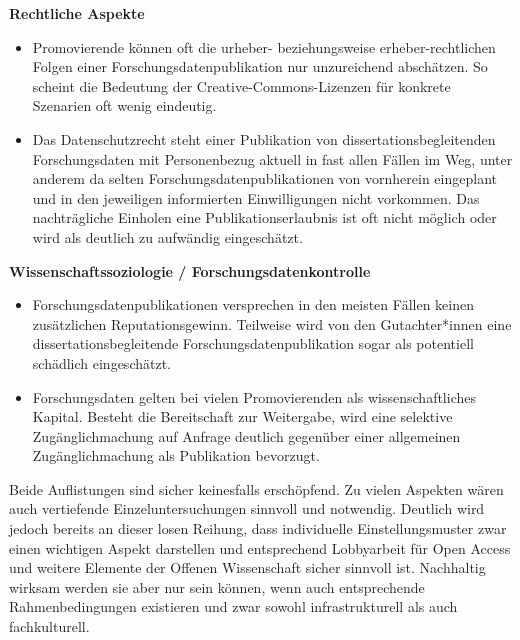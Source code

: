 \documentclass[a4paper,
fontsize=11pt,
oneside,
numbers=noperiodatend,
parskip=half-,
bibliography=totoc,
final
]{scrartcl}
\begin{document}
\textbf{Rechtliche Aspekte}

\begin{itemize}
\item
  Promovierende können oft die urheber- beziehungsweise
  erheber-rechtlichen Folgen einer Forschungsdatenpublikation nur
  unzureichend abschätzen. So scheint die Bedeutung der
  Creative-Commons-Lizenzen für konkrete Szenarien oft wenig eindeutig.
\item
  Das Datenschutzrecht steht einer Publikation von
  dissertationsbegleitenden Forschungsdaten mit Personenbezug aktuell in
  fast allen Fällen im Weg, unter anderem da selten
  Forschungsdatenpublikationen von vornherein eingeplant und in den
  jeweiligen informierten Einwilligungen nicht vorkommen. Das
  nachträgliche Einholen eine Publikationserlaubnis ist oft nicht
  möglich oder wird als deutlich zu aufwändig eingeschätzt.
\end{itemize}

\textbf{Wissenschaftssoziologie / Forschungsdatenkontrolle}

\begin{itemize}
\item
  Forschungsdatenpublikationen versprechen in den meisten Fällen keinen
  zusätzlichen Reputationsgewinn. Teilweise wird von den Gutachter*innen
  eine dissertationsbegleitende Forschungsdatenpublikation sogar als
  potentiell schädlich eingeschätzt.
\item
  Forschungsdaten gelten bei vielen Promovierenden als
  wissenschaftliches Kapital. Besteht die Bereitschaft zur Weitergabe,
  wird eine selektive Zugänglichmachung auf Anfrage deutlich gegenüber
  einer allgemeinen Zugänglichmachung als Publikation bevorzugt.
\end{itemize}

Beide Auflistungen sind sicher keinesfalls erschöpfend. Zu vielen
Aspekten wären auch vertiefende Einzeluntersuchungen sinnvoll und
notwendig. Deutlich wird jedoch bereits an dieser losen Reihung, dass
individuelle Einstellungsmuster zwar einen wichtigen Aspekt darstellen
und entsprechend Lobbyarbeit für Open Access und weitere Elemente der
Offenen Wissenschaft sicher sinnvoll ist. Nachhaltig wirksam werden sie
aber nur sein können, wenn auch entsprechende Rahmenbedingungen
existieren und zwar sowohl infrastrukturell als auch fachkulturell.
\end{document}
